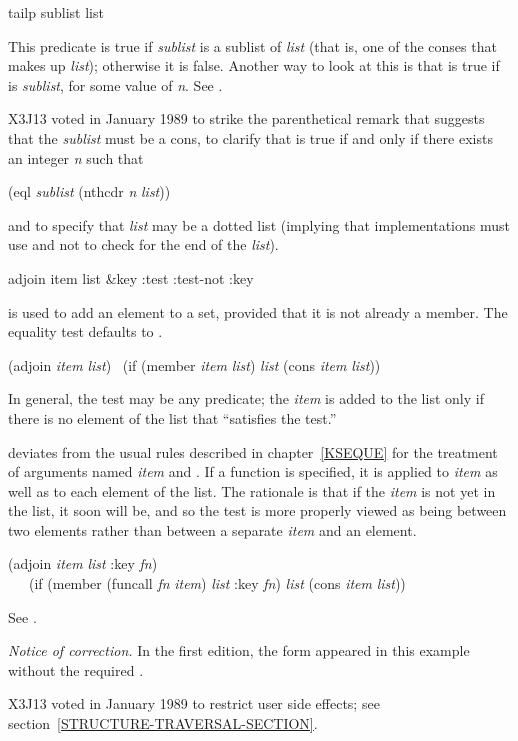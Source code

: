 \begin{defun}[Function]
tailp sublist list

This predicate is true if {\it sublist} is a sublist of {\it list} (that is,
one of the conses that makes up {\it list}); otherwise it is false.
Another way to look at this is that  is true if
 is {\it sublist}, for some value of {\it n}.
See .

\begin{new}
X3J13 voted in January 1989
to strike the parenthetical remark that suggests
that the {\it sublist} must be a cons, to clarify that 
is true if and only if there exists an integer {\it n} such that
\begin{lisp}
(eql {\it sublist} (nthcdr {\it n} {\it list}))
\end{lisp}
and to specify that {\it list} may be a dotted list (implying that
implementations must use  and not  to check for
the end of the {\it list}).
\end{new}
\end{defun}

\begin{defun}[Function]
adjoin item list &key :test :test-not :key

 is used to add an element to a set, provided that
it is not already a member.  The equality test defaults to .
\begin{lisp}
(adjoin {\it item} {\it list}) \EQ\ (if (member {\it item} {\it list}) {\it list} (cons {\it item} {\it list}))
\end{lisp}
In general, the test may be any predicate; the {\it item} is added to the
list only if there is no element of the list that ``satisfies the test.''

 deviates from the usual rules described in chapter~\ref{KSEQUE}
for the treatment of arguments named {\it item} and .
If a  function is specified, it is applied to {\it item}
as well as to each element of the list.  The rationale is that
if the {\it item} is not yet in the list, it soon will be, and so
the test is more properly viewed as being between two elements
rather than between a separate {\it item} and an element.
\begin{lisp}
(adjoin {\it item} {\it list} :key {\it fn}) \\
~~\EQ\ (if (member (funcall {\it fn} {\it item}) {\it list}
  :key {\it fn}) {\it list} (cons {\it item} {\it list})) \end{lisp}
See .
\begin{new}%
{\it Notice of correction.}
In the first edition, the form  appeared
in this example without the required .
\end{new}

\begin{new}
X3J13 voted in January 1989
to restrict user side effects; see section~\ref{STRUCTURE-TRAVERSAL-SECTION}.
\end{new}
\end{defun}

